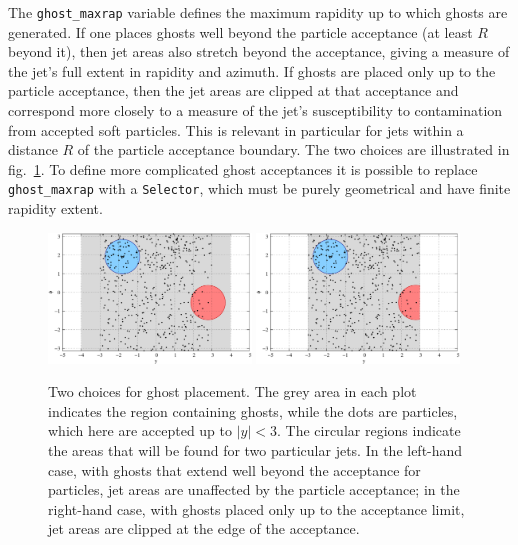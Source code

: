 \documentclass[12pt,a4]{article}
\newcommand{\ttt}[1]{{\small\texttt{#1}}}
\begin{document}
The \ttt{ghost\_maxrap} variable defines the maximum rapidity up to
which ghosts are generated.
%
If one places ghosts well beyond the particle acceptance (at least $R$
beyond it), then jet areas also stretch beyond the acceptance, giving
a measure of the jet's full extent in rapidity and azimuth.
%
If ghosts are placed only up to the particle acceptance, then the jet
areas are clipped at that acceptance and correspond more closely
to a measure of the jet's susceptibility to contamination from
accepted soft particles.
%
This is relevant in particular for jets within a distance $R$ of the
particle acceptance boundary.
%
The two choices are illustrated in fig.~\ref{fig:ghost-placement}.
%
To define more complicated ghost acceptances it is possible to replace
\ttt{ghost\_maxrap} with a \ttt{Selector}, which must be purely
geometrical and have finite rapidity extent.

\begin{figure}
  \centering
  \includegraphics[width=0.48\textwidth]{figs/ghost-extent-y4}\hfill
  \includegraphics[width=0.48\textwidth]{figs/ghost-extent-y3}
  \caption{Two choices for ghost placement. The grey area in each plot
    indicates
    the region containing ghosts, while the dots are particles, which
    here are accepted up to $|y|<3$. 
    The circular regions indicate the areas that will be found for two
    particular jets.  
    In the left-hand case, with ghosts that extend well beyond the
    acceptance for particles, jet areas are unaffected by the particle
    acceptance; 
    in the right-hand case, with ghosts placed only up to the
    acceptance limit, jet areas are clipped at the edge of the
    acceptance.  }
  \label{fig:ghost-placement}
\end{figure}
\end{document}
